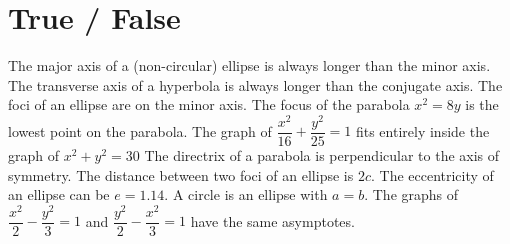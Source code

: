 \documentclass[11pt,answers]{exam}
\begin{document}
\section*{True / False}
\begin{questions}
\question[1] \tf[T] The major axis of a (non-circular) ellipse is always longer than the minor axis.
\question[1] \tf[F] The transverse axis of a hyperbola is always longer than the conjugate axis.
\question[1] \tf[F] The foci of an ellipse are on the minor axis.
\question[1] \tf[F] The focus of the parabola $x^2=8y$ is the lowest point on the parabola.
\question[1] \tf[T] The graph of $\dfrac{x^2}{16}+\dfrac{y^2}{25}=1$ fits entirely inside the graph of $x^2+y^2=30$
\question[1] \tf[T] The directrix of a parabola is perpendicular to the axis of symmetry.
\question[1] \tf[T] The distance between two foci of an ellipse is $2c$.
\question[1] \tf[F] The eccentricity of an ellipse can be $e=1.14$.
\question[1] \tf[T] A circle is an ellipse with $a=b$.
\question[1] \tf[F] The graphs of $\dfrac{x^2}{2}-\dfrac{y^2}{3} = 1$ and $\dfrac{y^2}{2}-\dfrac{x^2}{3} = 1$ have the same asymptotes.
\end{questions}

\vspace{3ex}
\clearpage
\end{document}
